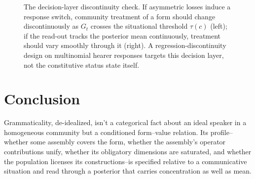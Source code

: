 \documentclass[12pt,letterpaper]{article}
\begin{document}
\begin{figure}[t]
\centering
{}
\caption{The decision-layer discontinuity check. If asymmetric losses induce a response switch, community treatment of a form should change discontinuously as $G_t$ crosses the situational threshold $\tau(c)$ (left); if the read-out tracks the posterior mean continuously, treatment should vary smoothly through it (right). A regression-discontinuity design on multinomial hearer responses targets this decision layer, not the constitutive status state itself.}
\label{fig:rd-test}
\end{figure}

\section{Conclusion}

Grammaticality, de-idealized, isn't a categorical fact about an ideal speaker in a homogeneous community but a conditioned form--value relation. Its profile--whether some assembly covers the form, whether the assembly's operator contributions unify, whether its obligatory dimensions are saturated, and whether the population licenses its constructions--is specified relative to a communicative situation and read through a posterior that carries concentration as well as mean.
\end{document}

